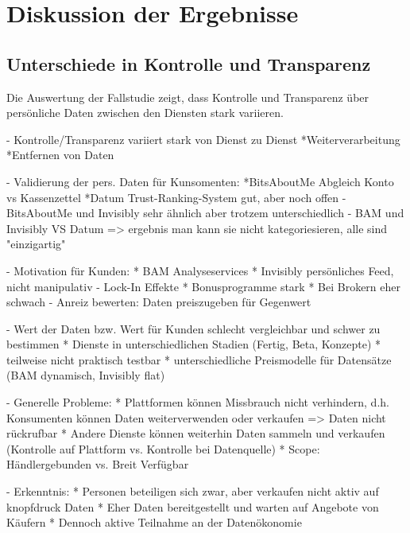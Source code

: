 \section{Diskussion der Ergebnisse}

\subsection{Unterschiede in Kontrolle und Transparenz}
Die Auswertung der Fallstudie zeigt, dass Kontrolle und Transparenz über persönliche Daten zwischen den Diensten stark variieren.

- Kontrolle/Transparenz variiert stark von Dienst zu Dienst
    *Weiterverarbeitung
    *Entfernen von Daten

- Validierung der pers. Daten für Kunsomenten: 
    *BitsAboutMe Abgleich Konto vs Kassenzettel
    *Datum Trust-Ranking-System gut, aber noch offen
- BitsAboutMe und Invisibly sehr ähnlich aber trotzem unterschiedlich
- BAM und Invisibly VS Datum
=> ergebnis man kann sie nicht kategoriesieren, alle sind "einzigartig"


- Motivation für Kunden:
    * BAM Analyseservices
    * Invisibly persönliches Feed, nicht manipulativ
- Lock-In Effekte
    * Bonusprogramme stark
    * Bei Brokern eher schwach
- Anreiz bewerten: Daten preiszugeben für Gegenwert

- Wert der Daten bzw. Wert für Kunden schlecht vergleichbar und schwer zu bestimmen
    * Dienste in unterschiedlichen Stadien (Fertig, Beta, Konzepte)
    * teilweise nicht praktisch testbar
    * unterschiedliche Preismodelle für Datensätze (BAM dynamisch, Invisibly flat)

- Generelle Probleme:
    * Plattformen können Missbrauch nicht verhindern, d.h. Konsumenten können Daten weiterverwenden oder verkaufen => Daten nicht rückrufbar
    * Andere Dienste können weiterhin Daten sammeln und verkaufen (Kontrolle auf Plattform vs. Kontrolle bei Datenquelle)
    * Scope: Händlergebunden vs. Breit Verfügbar

- Erkenntnis:
    * Personen beteiligen sich zwar, aber verkaufen nicht aktiv auf knopfdruck Daten
    * Eher Daten bereitgestellt und warten auf Angebote von Käufern
    * Dennoch aktive Teilnahme an der Datenökonomie